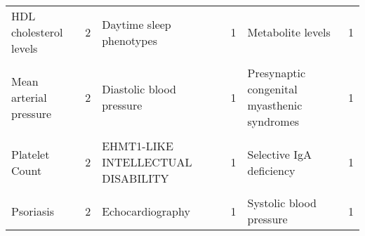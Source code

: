 \begin{table}[H]
{\begin{tabular}[t]{lrlrlr}
HDL cholesterol levels & 2 & Daytime sleep phenotypes & 1 & Metabolite levels & 1\\
\cellcolor{gray!6}{Hypothyroidism} & \cellcolor{gray!6}{2} & \cellcolor{gray!6}{Diabetes Mellitus} & \cellcolor{gray!6}{1} & \cellcolor{gray!6}{PHOSPHOGLYCERATE DEHYDROGENASE DEFICIENCY} & \cellcolor{gray!6}{1}\\
Mean arterial pressure & 2 & Diastolic blood pressure & 1 & Presynaptic congenital myasthenic syndromes & 1\\
\cellcolor{gray!6}{Metabolic syndrome} & \cellcolor{gray!6}{2} & \cellcolor{gray!6}{Diisocyanate-induced asthma} & \cellcolor{gray!6}{1} & \cellcolor{gray!6}{Schizophrenia} & \cellcolor{gray!6}{1}\\
Platelet Count & 2 & EHMT1-LIKE INTELLECTUAL DISABILITY & 1 & Selective IgA deficiency & 1\\
\cellcolor{gray!6}{Plateletcrit} & \cellcolor{gray!6}{2} & \cellcolor{gray!6}{EPILEPTIC ENCEPHALOPATHY, INFANTILE OR EARLY CHILDHOOD, 1} & \cellcolor{gray!6}{1} & \cellcolor{gray!6}{Systemic lupus erythematosus} & \cellcolor{gray!6}{1}\\
Psoriasis & 2 & Echocardiography & 1 & Systolic blood pressure & 1\\
\bottomrule
\end{tabular}}
\end{table}
